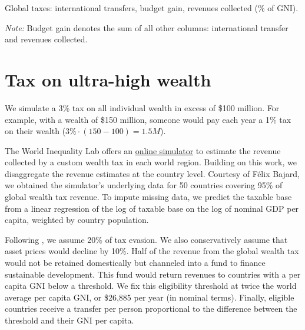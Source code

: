 \documentclass[12pt,english]{article}
\begin{document}
\clearpage
\begin{table}[!h]
  \caption{\label{tab:transfers_gain}Global taxes: international transfers, budget gain, revenues collected (\% of GNI).}
  \makebox[\textwidth][c]{
} 
{\footnotesize \textit{Note:} Budget gain denotes the sum of all other columns: international transfer and revenues collected. %
}
\end{table}
\clearpage


\section{Tax on ultra-high wealth}\label{sec:wealth}


We simulate a 3\% tax on all individual wealth in excess of \$100 million. For example, with a wealth of \$150 million, someone would pay each year a 1\% tax on their wealth ($3\% \cdot \left(150-100\right)=1.5M$). 


The World Inequality Lab offers an \href{https://wid.world/world-wealth-tax-simulator/}{online simulator} to estimate the revenue collected by a custom wealth tax in each world region. Building on this work, we disaggregate the revenue estimates at the country level. Courtesy of Félix Bajard, we obtained the simulator's underlying data for 50 countries covering 95\% of global wealth tax revenue. To impute missing data, we predict the taxable base from a linear regression of the log of taxable base on the log of nominal GDP per capita, weighted by country population. 

Following \cite{zucman_blueprint_2024}, we assume 20\% of tax evasion. We also conservatively assume that asset prices would decline by 10\%. Half of the revenue from the global wealth tax would not be retained domestically but channeled into a fund to finance sustainable development. This fund would return revenues to countries with a per capita GNI below a threshold. We fix this eligibility threshold at twice the world average per capita GNI, or \$26,885 per year (in nominal terms). Finally, eligible countries receive a transfer per person %
proportional to the difference between the threshold and their GNI per capita.
\end{document}
